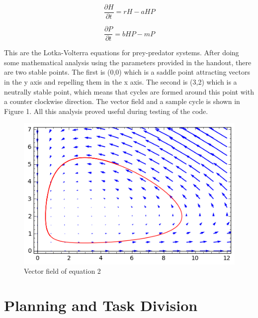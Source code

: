\documentclass[12pt,a4paper]{article}
\begin{document}
\begin{equation}
\frac{\partial H}{\partial t}=rH-aHP
\end{equation}

\begin{equation}
\frac{\partial P}{\partial t}=bHP-mP
\end{equation}

This are the Lotka-Volterra equations for prey-predator systems. After doing some mathematical analysis using the parameters provided in the handout, there are two stable points. The first is (0,0) which is a saddle point attracting vectors in the y axis and repelling them in the x axis. The second is (3,2) which is a neutrally stable point, which means that cycles are formed around this point with a counter clockwise direction. The vector field and a sample cycle is shown in Figure 1. All this analysis proved useful during testing of the code.  %


\clearpage


\begin{figure}[hb]
    \centering
    \includegraphics[scale=0.75]{images/sage2.png}
    \caption{Vector field of equation 2}
\end{figure}



\section{Planning and Task Division}
\end{document}
